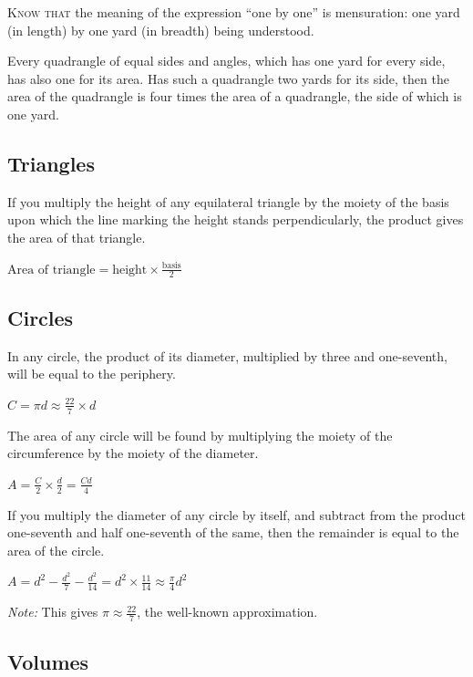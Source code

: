 \documentclass[11pt,a4paper,openany,oneside]{book}
\newcommand{\cnote}[1]{\textcolor{notecolor}{\textit{#1}}}
\begin{document}
\begin{minipage}[t]{0.48\textwidth}
\raggedright

\lettrine[lines=2, lhang=0.33, nindent=0em, findent=3pt, loversize=0.14]{
\textcolor{dropgold}{K}}{now that} the meaning of the expression ``one by one'' is mensuration: one yard (in length) by one yard (in breadth) being understood.

Every quadrangle of equal sides and angles, which has one yard for every side, has also one for its area. Has such a quadrangle two yards for its side, then the area of the quadrangle is four times the area of a quadrangle, the side of which is one yard.

\subsection*{Triangles}

If you multiply the height of any equilateral triangle by the moiety of the basis upon which the line marking the height stands perpendicularly, the product gives the area of that triangle.

$\text{Area of triangle} = \text{height} \times \frac{\text{basis}}{2}$

\subsection*{Circles}

In any circle, the product of its diameter, multiplied by three and one-seventh, will be equal to the periphery.

$C = \pi d \approx \frac{22}{7} \times d$

The area of any circle will be found by multiplying the moiety of the circumference by the moiety of the diameter.

$A = \frac{C}{2} \times \frac{d}{2} = \frac{Cd}{4}$

If you multiply the diameter of any circle by itself, and subtract from the product one-seventh and half one-seventh of the same, then the remainder is equal to the area of the circle.

$A = d^2 - \frac{d^2}{7} - \frac{d^2}{14} = d^2 \times \frac{11}{14} \approx \frac{\pi}{4} d^2$

\cnote{Note:} This gives $\pi \approx \frac{22}{7}$, the well-known approximation.

\subsection*{Volumes}


\end{minipage}
\end{document}
